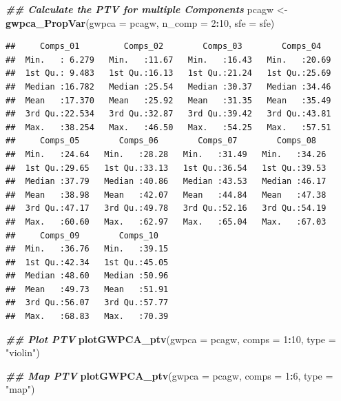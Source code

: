 \documentclass[
]{book}
\newenvironment{Shaded}{\begin{snugshade}}{\end{snugshade}}
\newcommand{\AttributeTok}[1]{\textcolor[rgb]{0.13,0.29,0.53}{#1}}
\newcommand{\DecValTok}[1]{\textcolor[rgb]{0.00,0.00,0.81}{#1}}
\newcommand{\DocumentationTok}[1]{\textcolor[rgb]{0.56,0.35,0.01}{\textbf{\textit{#1}}}}
\newcommand{\FunctionTok}[1]{\textcolor[rgb]{0.13,0.29,0.53}{\textbf{#1}}}
\newcommand{\NormalTok}[1]{#1}
\newcommand{\OtherTok}[1]{\textcolor[rgb]{0.56,0.35,0.01}{#1}}
\newcommand{\SpecialCharTok}[1]{\textcolor[rgb]{0.81,0.36,0.00}{\textbf{#1}}}
\newcommand{\StringTok}[1]{\textcolor[rgb]{0.31,0.60,0.02}{#1}}
\begin{document}
\begin{Shaded}
\begin{Highlighting}[]
\DocumentationTok{\#\# Calculate the PTV for multiple Components}
\NormalTok{pcagw }\OtherTok{\textless{}{-}} \FunctionTok{gwpca\_PropVar}\NormalTok{(}\AttributeTok{gwpca =}\NormalTok{ pcagw, }\AttributeTok{n\_comp =} \DecValTok{2}\SpecialCharTok{:}\DecValTok{10}\NormalTok{, }\AttributeTok{sfe =}\NormalTok{ sfe)}
\end{Highlighting}
\end{Shaded}

\begin{verbatim}
##     Comps_01         Comps_02        Comps_03        Comps_04    
##  Min.   : 6.279   Min.   :11.67   Min.   :16.43   Min.   :20.69  
##  1st Qu.: 9.483   1st Qu.:16.13   1st Qu.:21.24   1st Qu.:25.69  
##  Median :16.782   Median :25.54   Median :30.37   Median :34.46  
##  Mean   :17.370   Mean   :25.92   Mean   :31.35   Mean   :35.49  
##  3rd Qu.:22.534   3rd Qu.:32.87   3rd Qu.:39.42   3rd Qu.:43.81  
##  Max.   :38.254   Max.   :46.50   Max.   :54.25   Max.   :57.51  
##     Comps_05        Comps_06        Comps_07        Comps_08    
##  Min.   :24.64   Min.   :28.28   Min.   :31.49   Min.   :34.26  
##  1st Qu.:29.65   1st Qu.:33.13   1st Qu.:36.54   1st Qu.:39.53  
##  Median :37.79   Median :40.86   Median :43.53   Median :46.17  
##  Mean   :38.98   Mean   :42.07   Mean   :44.84   Mean   :47.38  
##  3rd Qu.:47.17   3rd Qu.:49.78   3rd Qu.:52.16   3rd Qu.:54.19  
##  Max.   :60.60   Max.   :62.97   Max.   :65.04   Max.   :67.03  
##     Comps_09        Comps_10    
##  Min.   :36.76   Min.   :39.15  
##  1st Qu.:42.34   1st Qu.:45.05  
##  Median :48.60   Median :50.96  
##  Mean   :49.73   Mean   :51.91  
##  3rd Qu.:56.07   3rd Qu.:57.77  
##  Max.   :68.83   Max.   :70.39
\end{verbatim}

\begin{Shaded}
\begin{Highlighting}[]
\DocumentationTok{\#\# Plot PTV}
\FunctionTok{plotGWPCA\_ptv}\NormalTok{(}\AttributeTok{gwpca =}\NormalTok{ pcagw,}
              \AttributeTok{comps =} \DecValTok{1}\SpecialCharTok{:}\DecValTok{10}\NormalTok{,}
              \AttributeTok{type =} \StringTok{"violin"}\NormalTok{)}

\DocumentationTok{\#\# Map PTV}
\FunctionTok{plotGWPCA\_ptv}\NormalTok{(}\AttributeTok{gwpca =}\NormalTok{ pcagw,}
              \AttributeTok{comps =} \DecValTok{1}\SpecialCharTok{:}\DecValTok{6}\NormalTok{,}
              \AttributeTok{type =} \StringTok{"map"}\NormalTok{)}
\end{Highlighting}
\end{Shaded}
\end{document}
